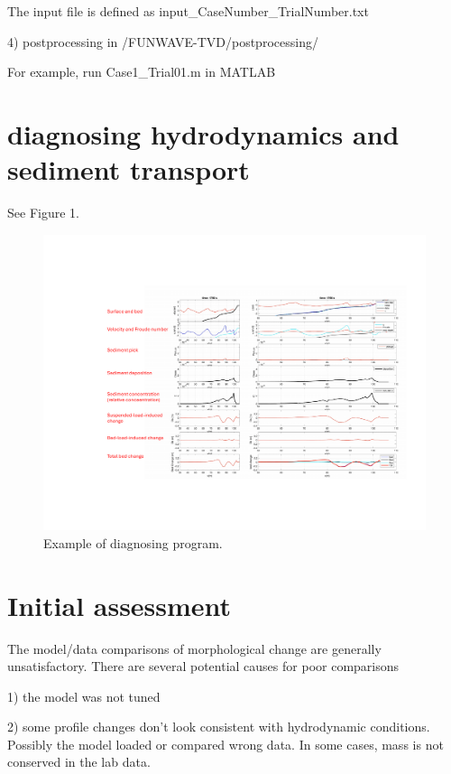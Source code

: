 \documentclass[preprint,10pt]{elsarticle}
\begin{document}
 The input file is defined as input\_CaseNumber\_TrialNumber.txt
 
 4) postprocessing in  /FUNWAVE-TVD/postprocessing/

For example, run Case1\_Trial01.m in MATLAB


\section*{diagnosing hydrodynamics and sediment transport}

See Figure 1. 

 \begin{figure}
\begin{center}
 \includegraphics[width=1.0\textwidth]{diagnose.pdf}
 \caption{Example of diagnosing program. }
 \label{lineargrid}
 \end{center}
 \end{figure}

\section*{Initial assessment}  

The model/data comparisons of morphological change are generally unsatisfactory. There are several potential causes for poor comparisons

1) the model was not tuned 

2) some profile changes don't look consistent with hydrodynamic conditions. Possibly the model loaded or compared wrong data. In some cases, mass is not conserved in the lab data. 
\end{document}
